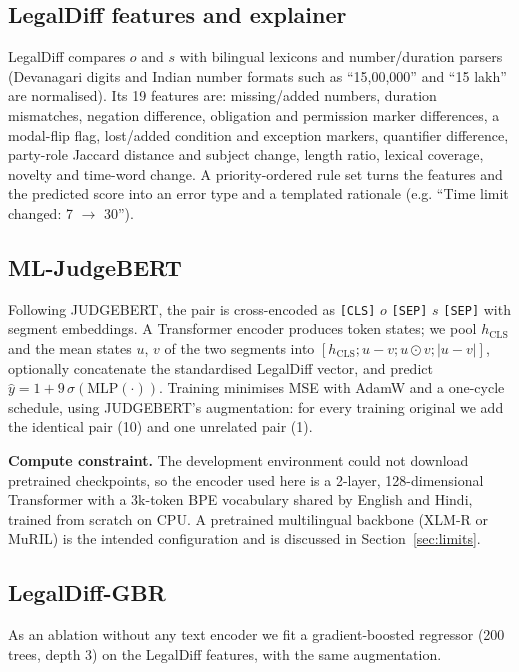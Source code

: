 \subsection{LegalDiff features and explainer}
LegalDiff compares $o$ and $s$ with bilingual lexicons and number/duration parsers (Devanagari digits and Indian number formats such as ``15,00,000'' and ``15 lakh'' are normalised). Its 19 features are: missing/added numbers, duration mismatches, negation difference, obligation and permission marker differences, a modal-flip flag, lost/added condition and exception markers, quantifier difference, party-role Jaccard distance and subject change, length ratio, lexical coverage, novelty and time-word change. A priority-ordered rule set turns the features and the predicted score into an error type and a templated rationale (e.g. ``Time limit changed: 7 $\rightarrow$ 30'').

\subsection{ML-JudgeBERT}
Following JUDGEBERT, the pair is cross-encoded as \texttt{[CLS]} $o$ \texttt{[SEP]} $s$ \texttt{[SEP]} with segment embeddings. A Transformer encoder produces token states; we pool $h_{\text{CLS}}$ and the mean states $u$, $v$ of the two segments into $[h_{\text{CLS}};u-v;u\odot v;|u-v|]$, optionally concatenate the standardised LegalDiff vector, and predict $\hat{y}=1+9\,\sigma(\mathrm{MLP}(\cdot))$. Training minimises MSE with AdamW and a one-cycle schedule, using JUDGEBERT's augmentation: for every training original we add the identical pair (10) and one unrelated pair (1).

\textbf{Compute constraint.} The development environment could not download pretrained checkpoints, so the encoder used here is a 2-layer, 128-dimensional Transformer with a 3k-token BPE vocabulary shared by English and Hindi, trained from scratch on CPU. A pretrained multilingual backbone (XLM-R or MuRIL) is the intended configuration and is discussed in Section~\ref{sec:limits}.

\subsection{LegalDiff-GBR}
As an ablation without any text encoder we fit a gradient-boosted regressor (200 trees, depth 3) on the LegalDiff features, with the same augmentation.

